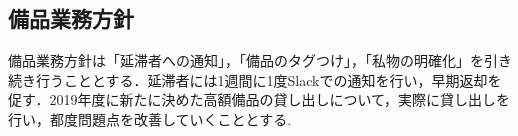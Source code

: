 \subsection*{備品業務方針}
備品業務方針は「延滞者への通知」，「備品のタグつけ」，「私物の明確化」を引き続き行うこととする．延滞者には1週間に1度Slackでの通知を行い，早期返却を促す．2019年度に新たに決めた高額備品の貸し出しについて，実際に貸し出しを行い，都度問題点を改善していくこととする.

